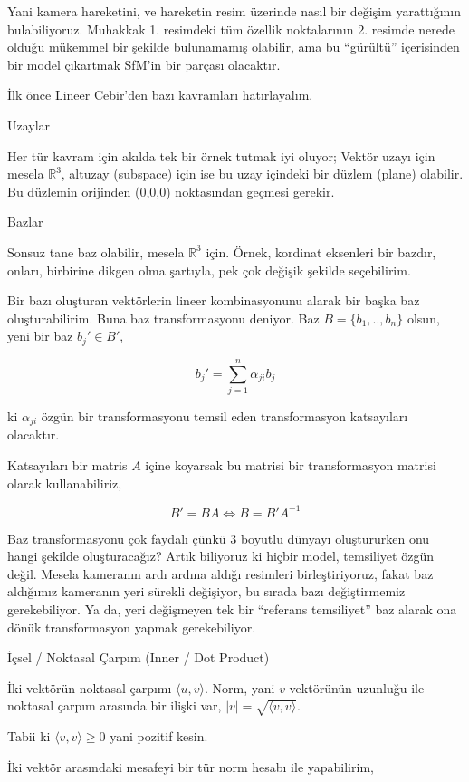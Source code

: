 \documentclass[12pt,fleqn]{article}\usepackage{../../common}
\begin{document}
Yani kamera hareketini, ve hareketin resim üzerinde nasıl bir değişim
yarattığının bulabiliyoruz. Muhakkak 1. resimdeki tüm özellik noktalarının
2. resimde nerede olduğu mükemmel bir şekilde bulunamamış olabilir, ama bu
``gürültü'' içerisinden bir model çıkartmak SfM'in bir parçası olacaktır.

İlk önce Lineer Cebir'den bazı kavramları hatırlayalım. 

Uzaylar

Her tür kavram için akılda tek bir örnek tutmak iyi oluyor; Vektör uzayı
için mesela $\mathbb{R}^3$, altuzay (subspace) için ise bu uzay içindeki
bir düzlem (plane) olabilir. Bu düzlemin orijinden (0,0,0) noktasından
geçmesi gerekir.

Bazlar

Sonsuz tane baz olabilir, mesela $\mathbb{R}^3$ için. Örnek, kordinat
eksenleri bir bazdır, onları, birbirine dikgen olma şartıyla, pek çok
değişik şekilde seçebilirim. 

Bir bazı oluşturan vektörlerin lineer kombinasyonunu alarak bir başka baz
oluşturabilirim. Buna baz transformasyonu deniyor. Baz $B = \{
b_1,..,b_n\}$ olsun, yeni bir baz $b_j' \in B'$,

$$ b_j' = \sum _{j=1}^{n} \alpha_{ji}b_j $$

ki $\alpha_{ji}$ özgün bir transformasyonu temsil eden transformasyon
katsayıları olacaktır. 

Katsayıları bir matris $A$ içine koyarsak bu matrisi bir transformasyon
matrisi olarak kullanabiliriz,

$$ B' = BA \iff B = B'A^{-1} $$

Baz transformasyonu çok faydalı çünkü 3 boyutlu dünyayı oluştururken onu
hangi şekilde oluşturacağız? Artık biliyoruz ki hiçbir model, temsiliyet
özgün değil. Mesela kameranın ardı ardına aldığı resimleri birleştiriyoruz,
fakat baz aldığımız kameranın yeri sürekli değişiyor, bu sırada bazı
değiştirmemiz gerekebiliyor. Ya da, yeri değişmeyen tek bir ``referans
temsiliyet'' baz alarak ona dönük transformasyon yapmak gerekebiliyor. 

İçsel / Noktasal Çarpım (Inner / Dot Product)

İki vektörün noktasal çarpımı $\langle u,v \rangle$. Norm, yani $v$
vektörünün uzunluğu ile noktasal çarpım arasında bir ilişki var, 
$|v| = \sqrt{\langle v,v \rangle}$.

Tabii ki $\langle v,v \rangle \ge 0$ yani pozitif kesin. 

İki vektör arasındaki mesafeyi bir tür norm hesabı ile yapabilirim, 
\end{document}
